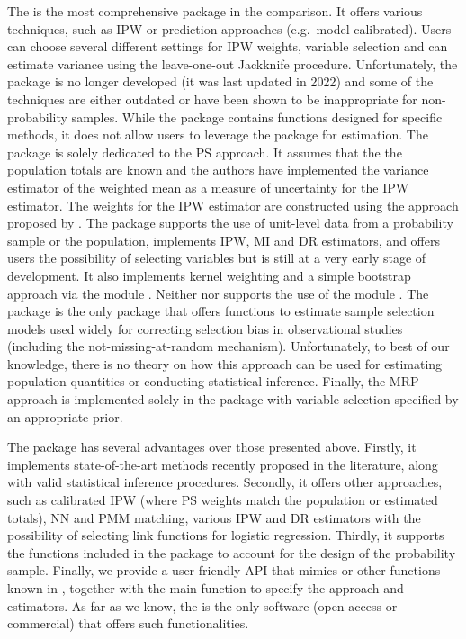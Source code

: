 \documentclass[
]{jss}
\begin{document}
The  is the most comprehensive package in the
comparison. It offers various techniques, such as IPW or prediction
approaches (e.g.~model-calibrated). Users can choose several different
settings for IPW weights, variable selection and can estimate variance
using the leave-one-out Jackknife procedure. Unfortunately, the package
is no longer developed (it was last updated in 2022) and some of the
techniques are either outdated or have been shown to be inappropriate
for non-probability samples. While the package contains functions
designed for specific methods, it does not allow users to leverage the
 package for estimation. The  package is solely
dedicated to the PS approach. It assumes that the the population totals
are known and the authors have implemented the variance estimator of the
weighted mean as a measure of uncertainty for the IPW estimator. The
weights for the IPW estimator are constructed using the approach
proposed by \citet{Schonlau2017}. The  package supports the
use of unit-level data from a probability sample or the population,
implements IPW, MI and DR estimators, and offers users the possibility
of selecting variables but is still at a very early stage of
development. It also implements kernel weighting and a simple bootstrap
approach via the  module \citep{scipy2020}. Neither
 nor  supports the use of the 
module \citep{Diallo2021}. The  package is the only package
that offers functions to estimate sample selection models used widely
for correcting selection bias in observational studies (including the
not-missing-at-random mechanism). Unfortunately, to best of our
knowledge, there is no theory on how this approach can be used for
estimating population quantities or conducting statistical inference.
Finally, the MRP approach is implemented solely in the 
package with variable selection specified by an appropriate prior.

The  package has several advantages over those presented
above. Firstly, it implements state-of-the-art methods recently proposed
in the literature, along with valid statistical inference procedures.
Secondly, it offers other approaches, such as calibrated IPW (where PS
weights match the population or estimated totals), NN and PMM matching,
various IPW and DR estimators with the possibility of selecting link
functions for logistic regression. Thirdly, it supports the functions
included in the  package to account for the design of the
probability sample. Finally, we provide a user-friendly API that mimics
 or other functions known in , together with the
main function to specify the approach and estimators. As far as we know,
the  is the only software (open-access or commercial)
that offers such functionalities.
\end{document}
